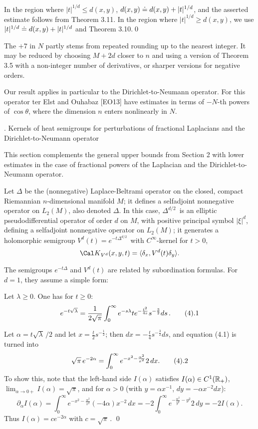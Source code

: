 \endproclaim

  In the region where $|t|^{1/d} \leq d(x,y)$, $d(x,y) \;\dot {=}\;
d(x,y)+|t|^{1/d}$, and the asserted estimate follows from Theorem 3.11.
In the region where $|t|^{1/d} \geq d(x,y)$, we use $|t|^{1/d} \;\dot {=}\;
d(x,y)+|t|^{1/d}$ and Theorem 3.10.\qed
\enddemo

  The $+7$ in $N$ partly stems from repeated rounding up to the nearest
integer. It may be reduced by choosing $M+2d$ closer to $n$ and using
a version of Theorem 3.5 with a non-integer number of derivatives, or
sharper versions for negative orders.

Our result applies in particular to the Dirichlet-to-Neumann operator.
For this operator ter Elst and Ouhabaz [EO13] have estimates in terms
of $-N$-th powers of  $\cos\theta $, where the dimension $n$ enters nonlinearly in $N$.
\endexample

. Kernels of heat semigroups for
perturbations of
fractional Laplacians and the Dirichlet-to-Neumann operator \endhead

This section complements the general upper bounds from Section 2
with lower estimates in the case of fractional powers of the Laplacian and the
Dirichlet-to-Neumann operator.

Let $\Delta $ be the (nonnegative) Laplace-Beltrami operator on the closed,
compact Riemannian $n$-dimensional manifold $M$; it defines a
selfadjoint nonnegative operator on $L_2(M)$, also denoted $\Delta$. In
this case,
$\Delta^{d/2} \,$ is an elliptic pseudodifferential operator of order $d$
on $M$, with positive principal symbol $|\xi|^d$, defining a selfadjoint
nonnegative
operator on $L_2(M)$; it generates a holomorphic semigroup $V^d(t) =
e^{-t\Delta^{d/2}
\,}$ with $C^\infty $-kernel for $t>0$,
$$
{\Cal K}_{V^d}(x,y,t)=\ang{\delta _x,V^d(t)\delta _y}.
$$



The semigroups $e^{-t\Delta }$ and $V^d(t)$ are related by subordination
formulas. For $d=1$, they assume a simple form:

Let $\lambda \ge 0$. One has for $t\ge 0$:
$$
 e^{-t\sqrt{\lambda }} = \frac{1}{2\sqrt{\pi }}\int_0^\infty e^{-s \lambda} t e^{-\frac{t^2}{4s}}
s^{-\frac32}ds\,.\tag4.1
$$
\endproclaim

  Let $\alpha =t\sqrt{\lambda }\,/2$ and let
$x=\frac{t}{2} s^{-\frac12}$; then $dx=-\frac{t}{4} s^{-\frac32}ds$, and
equation (4.1)
is turned into
$$
\sqrt{\pi }\,e^{-2\alpha }=\int_0^\infty e^{-x^2-\frac{\alpha ^2}{x^2}}2\,dx
.\tag4.2$$
To show this, note that the left-hand side $I(\alpha )$ satisfies
$
I(\alpha )\in C^1(\Bbb R_+)$, $ \lim_{\alpha \to 0+}I(\alpha )=\sqrt{\pi }$,
and for $\alpha >0$ (with $y=\alpha x^{-1}$, $dy=-\alpha x^{-2}dx$):
$$
\partial_\alpha I(\alpha )=\int_0^\infty e^{-x^2-\frac{\alpha
^2}{x^2}}(-4\alpha  )x^{-2}\,dx=-2\int_0^\infty e^{-\frac{\alpha
^2}{y^2}-y^2}2\,dy
=-2I(\alpha ).
$$
Thus $I(\alpha )=ce^{-2\alpha }$ with $c=\sqrt{\pi }\,$.
\qed
\enddemo

